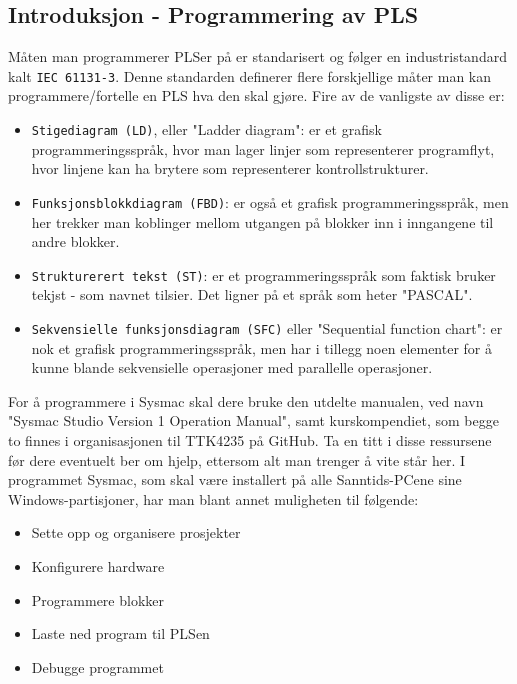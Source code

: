\begin{alphasection}
\section{Introduksjon - Programmering av PLS}

Måten man programmerer PLSer på er standarisert og følger en industristandard kalt \verb|IEC 61131-3|. Denne standarden definerer flere forskjellige måter man kan programmere/fortelle en PLS hva den skal gjøre. Fire av de vanligste av disse er:

\begin{itemize}
    \item \verb|Stigediagram (LD)|, eller "Ladder diagram": er et grafisk programmeringsspråk, hvor man lager linjer som representerer programflyt, hvor linjene kan ha brytere som representerer kontrollstrukturer.
    
    \item \verb|Funksjonsblokkdiagram (FBD)|: er også et grafisk programmeringsspråk, men her trekker man koblinger mellom utgangen på blokker inn i inngangene til andre blokker. 
    \item \verb|Strukturerert tekst (ST)|: er et programmeringsspråk som faktisk bruker tekjst - som navnet tilsier. Det ligner på et språk som heter "PASCAL".
    
    \item \verb|Sekvensielle funksjonsdiagram (SFC)| eller "Sequential function chart": er nok et grafisk programmeringsspråk, men har i tillegg noen elementer for å kunne blande sekvensielle operasjoner med parallelle operasjoner.
\end{itemize}

For å programmere i Sysmac skal dere bruke den utdelte manualen, ved navn "Sysmac Studio Version 1 Operation Manual", samt kurskompendiet, som begge to finnes i organisasjonen til TTK4235 på GitHub. Ta en titt i disse ressursene før dere eventuelt ber om hjelp, ettersom alt man trenger å vite står her. I programmet Sysmac, som skal være installert på alle Sanntids-PCene sine Windows-partisjoner, har man blant annet muligheten til følgende:

\begin{itemize}
    \item Sette opp og organisere prosjekter
    \item Konfigurere hardware
    \item Programmere blokker
    \item Laste ned program til PLSen
    \item Debugge programmet
\end{itemize}


\end{alphasection}
